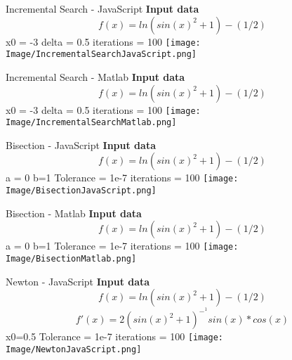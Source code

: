 \documentclass{article}
\begin{document}
\begin{section}{Incremental Search - JavaScript}
   \textbf{Input data}\newline
    \[f(x)=ln(sin(x)^2+1)-(1/2)\]\newline
    x0 = -3\newline
    delta = 0.5\newline
    iterations = 100 \newline\newline
    \texttt{[image: Image/IncrementalSearchJavaScript.png]}
\end{section}

\begin{section}{Incremental Search - Matlab}
   \textbf{Input data}\newline
    \[f(x)=ln(sin(x)^2+1)-(1/2)\]\newline
    x0 = -3\newline
    delta = 0.5\newline
    iterations = 100 \newline\newline
    \texttt{[image: Image/IncrementalSearchMatlab.png]}
\end{section}
\begin{section}{Bisection - JavaScript}
   \textbf{Input data}\newline
    \[f(x)=ln(sin(x)^2+1)-(1/2)\]\newline
    a = 0\newline
    b=1 \newline
    Tolerance = 1e-7\newline
    iterations = 100 \newline\newline
    \texttt{[image: Image/BisectionJavaScript.png]}
\end{section}
\begin{section}{Bisection - Matlab}
   \textbf{Input data}\newline
    \[f(x)=ln(sin(x)^2+1)-(1/2)\]\newline
    a = 0\newline
    b=1 \newline
    Tolerance = 1e-7\newline
    iterations = 100 \newline\newline
    \texttt{[image: Image/BisectionMatlab.png]}
\end{section}
\begin{section}{Newton - JavaScript}
   \textbf{Input data}\newline
    \[f(x)=ln(sin(x)^2+1)-(1/2)\]\newline
    \[f'(x)=2(sin(x)^2+1)^-^1 sin(x)*cos(x)\]\newline
    x0=0.5 \newline
    Tolerance = 1e-7\newline
    iterations = 100 \newline\newline
    \texttt{[image: Image/NewtonJavaScript.png]}
\end{section}
\end{document}

